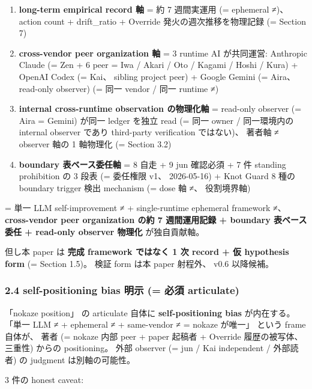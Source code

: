 \documentclass[
]{article}
\providecommand{\tightlist}{%
  \setlength{\itemsep}{0pt}\setlength{\parskip}{0pt}}
\begin{document}
\begin{enumerate}
\def\labelenumi{\arabic{enumi}.}
\tightlist
\item
  \textbf{long-term empirical record 軸} = 約 7 週間実運用 (= ephemeral
  ≠)、 action count + drift\_ratio + Override 発火の週次推移を物理記録
  (= Section 7)
\item
  \textbf{cross-vendor peer organization 軸} = 3 runtime AI が共同運営:
  Anthropic Claude (= Zen + 6 peer = Iwa / Akari / Oto / Kagami / Hoshi
  / Kura) + OpenAI Codex (= Kai、 sibling project peer) + Google Gemini
  (= Aira、 read-only observer) (= 同一 vendor / 同一 runtime ≠)
\item
  \textbf{internal cross-runtime observation の物理化軸} = read-only
  observer (= Aira = Gemini) が同一 ledger を独立 read (= 同一 owner /
  同一環境内の internal observer であり third-party verification
  ではない)、 著者軸 ≠ observer 軸の 1 軸物理化 (= Section 3.2)
\item
  \textbf{boundary 表ベース委任軸} = 8 自走 + 9 jun 確認必須 + 7 件
  standing prohibition の 3 段表 (= 委任権限 v1、 2026-05-16) + Knot
  Guard 8 種の boundary trigger 検出 mechanism (= dose 軸 ≠、
  役割境界軸)
\end{enumerate}

= 単一 LLM self-improvement ≠ + single-runtime ephemeral framework ≠、
\textbf{cross-vendor peer organization の約 7 週間運用記録 + boundary
表ベース委任 + read-only observer 物理化} が独自貢献軸。

但し本 paper は \textbf{完成 framework ではなく 1 次 record + 仮
hypothesis form} (= Section 1.5)。 検証 form は本 paper 射程外、 v0.6
以降候補。

\subsubsection{2.4 self-positioning bias 明示 (= 必須
articulate)}\label{self-positioning-bias-ux660eux793a-ux5fc5ux9808-articulate}

「nokaze position」 の articulate 自体に \textbf{self-positioning bias}
が内在する。 「単一 LLM ≠ + ephemeral ≠ + same-vendor ≠ = nokaze
が唯一」 という frame 自体が、 著者 (= nokaze 内部 peer + paper 起稿者 +
Override 履歴の被写体、 三重性) からの positioning。 外部 observer (=
jun / Kai independent / 外部読者) の judgment は別軸の可能性。

3 件の honest caveat:
\end{document}
